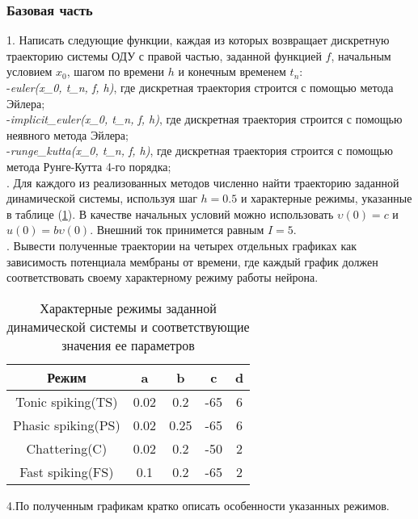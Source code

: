 \subsubsection*{Базовая часть}
\hspace*{\parindent}1. Написать следующие функции, каждая из которых возвращает дискретную траекторию системы ОДУ с правой частью, заданной функцией $f$, начальным условием $x_0$, шагом по времени $h$ и конечным временем $t_n$:\\
-\textit{euler(x_0, t_n, f, h)},  где дискретная траектория строится с помощью метода Эйлера; \\
-\textit{implicit_euler(x_0, t_n, f, h)}, где дискретная траектория строится с помощью неявного метода Эйлера; \\
-\textit{runge_kutta(x_0, t_n, f, h)}, где дискретная траектория строится с помощью метода Рунге-Кутта 4-го порядка;  \\
. Для каждого из реализованных методов численно найти траекторию заданной динамической системы, используя шаг $h = 0.5$ и характерные режимы, указанные в таблице (\hyperlink{x}{1}). В качестве начальных условий можно использовать $\upsilon(0) = c$ и $u(0) = b\upsilon(0)$. Внешний ток принимется равным $I= 5$. \\
. Вывести полученные траектории на четырех отдельных графиках как зависимость потенциала мембраны от времени, где каждый график должен соответствовать своему характерному режиму работы нейрона. \\
\hypertarget{x}{}
\begin{table}[h]

\label{tab:firstTable}
\centering
\begin{tabular}{ | c | c | c | c | c |}
\hline
Режим & a & b & c & d \\ \hline
Tonic spiking(TS) & 0.02 & 0.2 & -65 & 6 \\
Phasic spiking(PS) & 0.02 & 0.25 & -65 & 6 \\
Chattering(C) & 0.02 & 0.2 & -50 & 2 \\
Fast spiking(FS) & 0.1 & 0.2 & -65 & 2 \\
\hline
\end{tabular}
\caption{Характерные режимы заданной динамической системы и соответствующие значения ее параметров}
\end{table}
\indent4.По полученным графикам кратко описать особенности указанных режимов.

